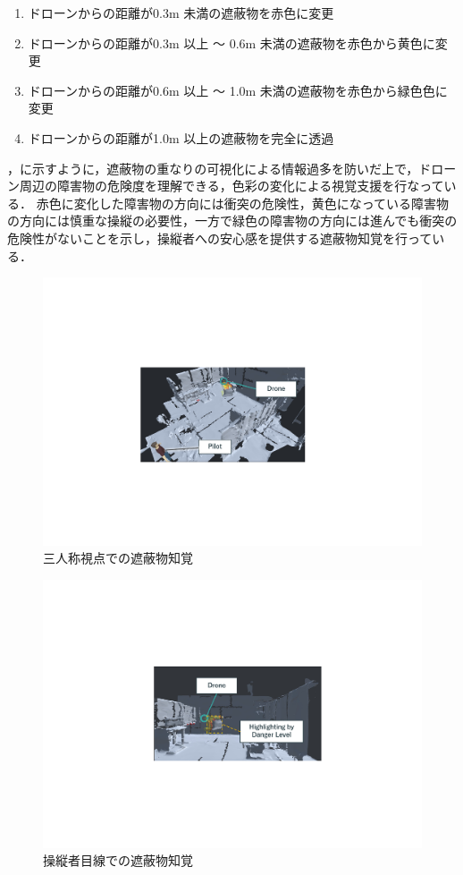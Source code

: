 \documentclass[a4paper,11pt]{ujreport}
\begin{document}
\begin{enumerate}
	\item ドローンからの距離が0.3m 未満の遮蔽物を赤色に変更
    
  \item ドローンからの距離が0.3m 以上 〜 0.6m 未満の遮蔽物を赤色から黄色に変更
    
  \item ドローンからの距離が0.6m 以上 〜 1.0m 未満の遮蔽物を赤色から緑色色に変更
  
  \item ドローンからの距離が1.0m 以上の遮蔽物を完全に透過
\end{enumerate}

，に示すように，遮蔽物の重なりの可視化による情報過多を防いだ上で，ドローン周辺の障害物の危険度を理解できる，色彩の変化による視覚支援を行なっている．
赤色に変化した障害物の方向には衝突の危険性，黄色になっている障害物の方向には慎重な操縦の必要性，一方で緑色の障害物の方向には進んでも衝突の危険性がないことを示し，操縦者への安心感を提供する遮蔽物知覚を行っている．

\begin{figure}[!tb]
  \centering
  \includegraphics[width=0.8\linewidth]{img/03_danger1.pdf}
  \caption{三人称視点での遮蔽物知覚}
  \label{fig:03_dangerLevel1}
\end{figure}
\begin{figure}[!tb]
  \centering
  \includegraphics[width=0.8\linewidth]{img/03_danger2.pdf}
  \caption{操縦者目線での遮蔽物知覚}
  \label{fig:03_dangerLevel2}
\end{figure}
\end{document}
